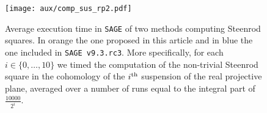 \begin{figure}
	\texttt{[image: aux/comp\_sus\_rp2.pdf]}
	\caption{Average execution time in \texttt{SAGE} of two methods computing Steenrod squares. In orange the one proposed in this article and in blue the one included in \texttt{SAGE v9.3.rc3}. More specifically, for each $i \in \{0, \dots, 10\}$ we timed the computation of the non-trivial Steenrod square in the cohomology of the $i^{\mathrm{th}}$ suspension of the real projective plane, averaged over a number of runs equal to the integral part of $\frac{10000}{2^i}$.}
	\label{f:comparison}
\end{figure}